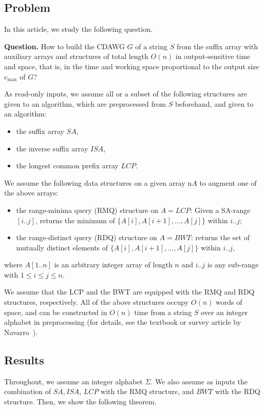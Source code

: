 \documentclass{article}
\begin{document}
\subsection{Problem}
In this article, we study the following question. 

\begin{trivlist}{\item[] \noindent \textbf{Question.}
How to build the CDAWG $G$ of a string $S$ from the suffix array with auxiliary arrays and structures of total length $O(n)$ in output-sensitive time and space, that is, in the time and working space proportional to the output size $e_{\max}$ of $G$?
}\end{trivlist}

As read-only inputs, we assume all or a subset of the following structures are given to an algorithm, which are preprocessed from $S$ beforehand, and given to an algorithm:
\begin{itemize}
\item the suffix array $SA$,
\item the inverse suffix array $ISA$,
\item the longest common prefix array $LCP$.
\end{itemize}

We assume the following data structures on a given array n$A$ to augment one of the above arrays:  
\begin{itemize}
\item the range-minima query (RMQ) structure on $A = LCP$: Given a SA-range $[i..j]$, returns the minimum of $\{A[i], A[i+1], \dots, A[j]\}$ within $i..j$; 
  
\item the range-distinct query (RDQ) structure on $A = BWT$: returns the set of mutually distinct elements of $\{A[i], A[i+1], \dots, A[j]\}$ within $i..j$, 
\end{itemize}
where $A[1..n]$ is an arbitrary integer array of length $n$ and $i..j$ is any sub-range with $1\le i\le j\le n$. 

We assume that the LCP and the BWT are equipped with the RMQ and RDQ structures, respectively. 
All of the above structures occupy $O(n)$ words of space, and can be constructed in $O(n)$ time from a string $S$ over an integer alphabet in preprocessing (for details, see the textbook or survey article by Navarro~\cite{navarro2016cds:book,navarro2021indexing:ii}).

\subsection{Results}
Throughout, we assume an integer alphabet $\Sigma$.
We also assume as inputs the combination of $SA, ISA$, $LCP$ with the RMQ structure, and $BWT$ with the RDQ structure. 
Then, we show the following theorem.
\end{document}
